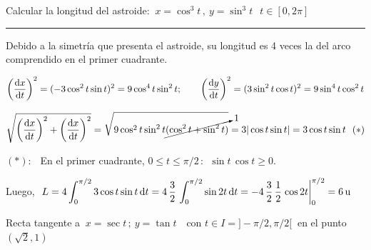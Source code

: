 \begin{miejercicio}

Calcular la longitud del astroide: $\ x=\cos^3 t\,, \ y=\sin^3 t\;\ \ t\in [0,2\pi]$

\rule{300pt}{0.2pt}

Debido a la simetría que presenta el astroide, su longitud es 4 veces la del arco comprendido en el primer cuadrante.

$\displaystyle \left(\dv{x}{t}\right)^2=(-3\cos^2 t \sin t)^2=9\cos^4 t \sin^2 t;\qquad \left(\dv{y}{t}\right)^2=(3\sin^2 t \cos t)^2=9\sin^4 t \cos^2 t$

$\displaystyle \sqrt{\left(\dv{x}{t}\right)^2+\left(\dv{x}{t}\right)^2}=\sqrt{9\cos^2 t\sin^2 t \cancelto{1}{(\cos^2 t+\sin^2 t)}}=3|\cos t \sin t|=3\cos t\sin t \ \ (*)$

\textcolor{gris}\small{$(*):\ \ $ En el primer cuadrante, $0\leqslant t\leqslant \pi/2\, : \ \ \sin t\, \cos t\geqslant 0$}\normalsize{.}

Luego, $\ \displaystyle L=4\int_0^{\pi/2} 3 \cos t \sin t \, \dd t
=4\, \dfrac 3 2 \, \int_0^{\pi/2} \sin 2 t \, \dd t = -4\, \dfrac 3 2 \, \dfrac 1 2 \eval{\cos 2t}_0^{\pi/2}= 6\, \mathrm{u}$ 
\end{miejercicio}


\vspace{5mm}

\begin{mipropuesto}

Recta tangente a  $\ x=\sec t\, ; \ y=\tan t \ \ \ \text{ con } t\in I=]-\pi/2,\pi/2[\ $ en el punto $(\sqrt 2,1)$

\end{mipropuesto}
	
